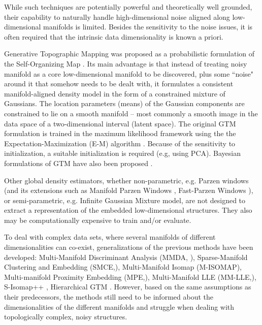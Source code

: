While such techniques are potentially powerful and theoretically well grounded,
their capability to naturally handle high-dimensional noise aligned along low-dimensional manifolds is limited.
Besides the sensitivity to the noise issues, it is often required that the intrinsic data dimensionality is known a priori. 

Generative Topographic Mapping \cite[GTM, ][]{Bishop1998GTMTG} was proposed as a probabilistic formulation of the Self-Organizing Map \citep{Kohonen1982}.
Its main advantage is that instead of treating noisy manifold as a core low-dimensional manifold to be discovered,
plus some ``noise" around it that somehow needs to be dealt with, 
it formulates a consistent manifold-aligned density model in the form of a constrained mixture of Gaussians.
The location parameters (means) of the Gaussian components are constrained to lie on a smooth manifold 
-- most commonly a smooth image in the data space of a two-dimensional interval (latent space). 
The original GTM formulation is trained in the maximum likelihood framework using the the Expectation-Maximization (E-M) algorithm \citep{10.2307/2984875}.
Because of the sensitivity to initialization, a suitable initialization is required (e.g, using PCA).
Bayesian formulations of GTM have also been proposed
\cite{Olier2008VariationalBG}.

Other global density estimators, whether non-parametric, e.g. Parzen windows \cite{parzen1962estimation} (and its extensions such as
Manifold Parzen Windows \cite{NIPS2002_2203}, Fast-Parzen Windows \cite{5178637}), or semi-parametric, e.g. Infinite Gaussian Mixture model\cite{10.5555/3009657.3009736}, are not designed to extract a representation of the embedded low-dimensional structures.
They also may be computationally expensive to train and/or evaluate. 

To deal with complex data sets, where several manifolds of different dimensionalities can co-exist,
generalizations of the previous methods have been developed: Multi-Manifold Discriminant Analysis (MMDA, \cite{Yang:2011:MDA:1963661.1963809}), Sparse-Manifold 
Clustering and Embedding (SMCE,\cite{NIPS2011_4246}), Multi-Manifold Isomap (M-ISOMAP\cite{Fan2012IsometricML}), Multi-manifold Proximity Embedding  (MPE,\cite{Fan:2016:EIM:2903049.2903101}), Multi-Manifold LLE 
(MM-LLE,\cite{Hettiarachchi:2015:MLL:2791619.2792198}), S-Isomap++ 
\cite{2017arXiv171006462M}, Hierarchical GTM \cite{Tino_PAMI_2002}. However, based on the same assumptions as their predecessors, the methods still need to be informed about the dimensionalities of the different manifolds {and struggle when dealing with topologically complex, noisy structures}.

